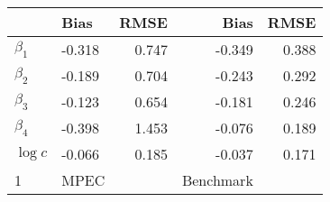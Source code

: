
\begin{tabular}[t]{llrrr}
\toprule
  & Bias & RMSE & Bias & RMSE\\
\midrule
$\beta_{1}$ & -0.318 & 0.747 & -0.349 & 0.388\\
$\beta_{2}$ & -0.189 & 0.704 & -0.243 & 0.292\\
$\beta_{3}$ & -0.123 & 0.654 & -0.181 & 0.246\\
$\beta_{4}$ & -0.398 & 1.453 & -0.076 & 0.189\\
$\log c$ & -0.066 & 0.185 & -0.037 & 0.171\\
1 & MPEC &  & Benchmark & \\
\bottomrule
\end{tabular}
